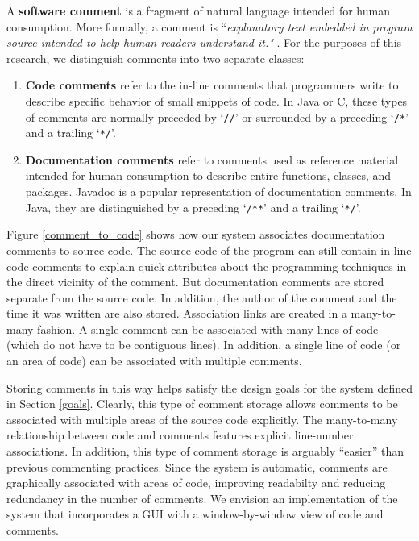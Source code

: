 A \textbf{software comment} is a fragment of natural language intended for human
consumption. More formally, a comment is ``\textit{explanatory text embedded in
program source intended to help human readers understand it."} \cite{FOLDOC}.
For the purposes of this research, we distinguish comments into two separate 
classes: 
\begin{enumerate}
  \item \textbf{Code comments} refer to the in-line comments that programmers 
  write to describe specific behavior of small snippets of code. In Java or C,
  these types of comments are normally preceded by `\verb!//!' or surrounded by
  a preceding `\verb!/*!' and a trailing `\verb!*/!'.
  \item \textbf{Documentation comments} refer to comments used as reference
  material intended for human consumption to describe entire functions, classes,
  and packages. Javadoc \cite{Javadoc} is a popular representation of 
  documentation comments. In Java, they are distinguished by a preceding
  `\verb!/**!' and a trailing `\verb!*/!'.
\end{enumerate}

Figure \ref{comment_to_code} shows how our system associates documentation
comments to source code. The source code of the program can still contain
in-line code comments to explain quick attributes about the programming
techniques in the direct vicinity of the comment. But documentation comments
are stored separate from the source code. In addition, the author of the
comment and the time it was written are also stored. Association links are
created in a many-to-many fashion. A single comment can be associated with many
lines of code (which do not have to be contiguous lines). In addition, a single
line of code (or an area of code) can be associated with multiple comments.

Storing comments in this way helps satisfy the design goals for the system 
defined in Section \ref{goals}. Clearly, this type of comment storage allows
comments to be associated with multiple areas of the source code explicitly. The
many-to-many relationship between code and comments features explicit 
line-number associations. In addition, this type of comment storage is arguably
``easier'' than previous commenting practices. Since the system is automatic,
comments are graphically associated with areas of code, improving readabilty and
reducing redundancy in the number of comments. We envision an implementation of
the system that incorporates a GUI with a window-by-window view of code and
comments.

